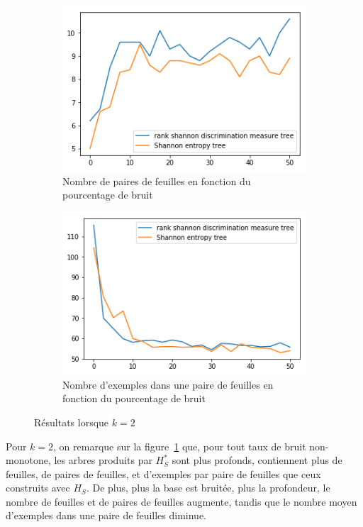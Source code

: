\documentclass[a4paper]{article}
\newcommand{\figref}[1]{figure~\ref{#1}}
\begin{document}
\begin{figure}[H]
    \begin{subfigure}[c]{0.46\textwidth}
        \centering
        \includegraphics[width=\textwidth]{images/nbpairs_2.png}
        \caption{Nombre de paires de feuilles en fonction du pourcentage de bruit}
    \end{subfigure}
    \begin{subfigure}[c]{0.46\textwidth}
        \centering
        \includegraphics[width=\textwidth]{images/nbexamples_2.png}
        \caption{Nombre d'exemples dans une paire de feuilles en fonction du pourcentage de bruit}
    \end{subfigure}

    \caption{Résultats lorsque $k=2$}
    \label{results:artificial2}
\end{figure}

Pour $k=2$, on remarque sur la \figref{results:artificial2} que, pour tout taux
de bruit non-monotone, les arbres
produits par $H^*_S$ sont plus profonds, contiennent plus de feuilles, de paires
de feuilles, et d'exemples par paire de feuilles que ceux construits avec $H_S$.
De plus, plus la base est bruitée, plus la profondeur, le nombre de feuilles et de
paires de feuilles augmente, tandis que le nombre moyen d'exemples dans une
paire de feuilles diminue.
\end{document}
